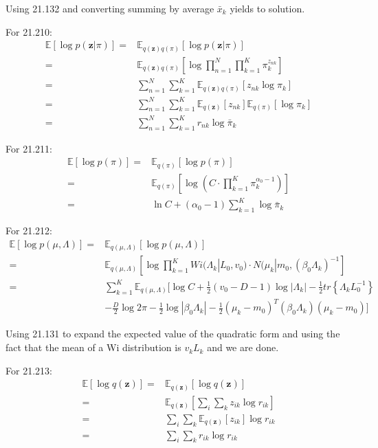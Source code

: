 \documentclass[UTF8]{ctexart}
\begin{document}
Using 21.132 and converting summing by average $\bar{x}_{k}$ yields to solution.

For 21.210:
\begin{align}
\mathbb{E}[\log p(\textbf{z}|\pi)]=&\mathbb{E}_{q(\textbf{z})q(\pi)}[\log p(\textbf{z}|\pi)]\nonumber \\
=&\mathbb{E}_{q(\textbf{z})q(\pi)}[\log \prod_{n=1}^{N}\prod_{k=1}^{K}\pi_{k}^{z_{nk}}] \nonumber \\
=&\sum_{n=1}^{N}\sum_{k=1}^{K}\mathbb{E}_{q(\textbf{z})q(\pi)}[z_{nk}\log \pi_{k}]\nonumber \\
=&\sum_{n=1}^{N}\sum_{k=1}^{K}\mathbb{E}_{q(\textbf{z})}[z_{nk}]\mathbb{E}_{q(\pi)}[\log \pi_{k}]\nonumber \\
=&\sum_{n=1}^{N}\sum_{k=1}^{K}r_{nk}\log \bar{\pi}_{k}\nonumber
\end{align}

For 21.211:
\begin{align}
\mathbb{E}[\log p(\pi)]=&\mathbb{E}_{q(\pi)}[\log p(\pi)] \nonumber \\
=&\mathbb{E}_{q(\pi)}[\log (C\cdot \prod_{k=1}^{K}\pi_{k}^{\alpha_{0}-1})]\nonumber \\
=&\ln C + (\alpha_{0}-1)\sum_{k=1}^{K}\log \bar{\pi}_{k} \nonumber
\end{align}

For 21.212:
\begin{align}
\mathbb{E}[\log p(\mu,\Lambda)]=&\mathbb{E}_{q(\mu,\Lambda)}[\log p(\mu,\Lambda)] \nonumber \\
=&\mathbb{E}_{q(\mu,\Lambda)}[\log \prod_{k=1}^{K}Wi(\Lambda_{k}|L_{0},v_{0})\cdot N(\mu_{k}|m_{0},(\beta_{0}\Lambda_{k})^{-1}]\nonumber \\
=&\sum_{k=1}^{K}\mathbb{E}_{q(\mu,\Lambda)}[ \log C + \frac{1}{2}(v_{0}-D-1)\log |\Lambda_{k}| -\frac{1}{2}tr\left\{ \Lambda_{k}L_{0}^{-1} \right\}\nonumber \\
\ & - \frac{D}{2}\log 2 \pi - \frac{1}{2}\log |\beta_{0}\Lambda_{k}| -\frac{1}{2}(\mu_{k}-m_{0})^{T}(\beta_{0}\Lambda_{k})(\mu_{k}-m_{0}) ]\nonumber
\end{align}

Using 21.131 to expand the expected value of the quadratic form and using the fact that the mean of a Wi distribution is $v_{k}L_{k}$ and we are done.

For 21.213:
\begin{align}
\mathbb{E}[\log q(\textbf{z})]=& \mathbb{E}_{q(\textbf{z})}[\log q(\textbf{z})] \nonumber \\
=&\mathbb{E}_{q(\textbf{z})}[\sum_{i}\sum_{k}z_{ik}\log r_{ik}]\nonumber \\
=&\sum_{i}\sum_{k} \mathbb{E}_{q(\textbf{z})}[z_{ik}]\log r_{ik}\nonumber \\
=& \sum_{i}\sum_{k} r_{ik}\log r_{ik}\nonumber
\end{align}
\end{document}
